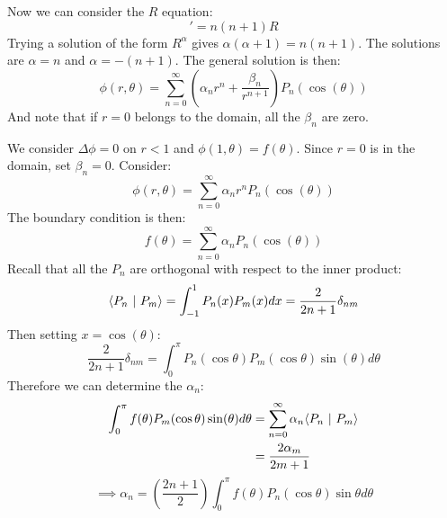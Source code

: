\documentclass[../Main.tex]{subfiles}
\begin{document}
Now we can consider the $R$ equation:
\begin{equation*}
    [r^2 R']' = n(n+1)R
\end{equation*}
Trying a solution of the form $R^\alpha$ gives $\alpha(\alpha+1) = n(n+1)$. The solutions are $\alpha = n$ and $\alpha = -(n+1)$. The general solution is then:
\begin{equation*}
    \phi(r, \theta) = \sum_{n=0}^{\infty} \left(\alpha_n r^n + \frac{\beta_n}{r^{n+1}}\right) P_n(\cos(\theta))
\end{equation*}
And note that if $r = 0$ belongs to the domain, all the $\beta_n$ are zero.
\begin{example}
    We consider $\Delta \phi = 0$ on $r < 1$ and $\phi(1, \theta) = f(\theta)$. Since $r = 0$ is in the domain, set $\beta_n = 0$. Consider:
    \begin{equation*}
        \phi(r, \theta) = \sum_{n=0}^{\infty} \alpha_nr^n P_n(\cos(\theta))
    \end{equation*}
    The boundary condition is then:
    \begin{equation*}
        f(\theta) = \sum_{n=0}^{\infty} \alpha_n P_n(\cos(\theta))
    \end{equation*}
    Recall that all the $P_n$ are orthogonal with respect to the inner product:
    \begin{equation*}
        \langle P_n~\vert~P_m\rangle = \int_{-1}^{1} P_n(x)P_m(x) dx = \frac{2}{2n+1}\delta_{nm}
    \end{equation*}
    Then setting $x = \cos(\theta)$:
    \begin{equation*}
        \frac{2}{2n+1}\delta_{nm} = \int_{0}^{\pi} P_n(\cos{\theta}) P_m (\cos{\theta})\sin(\theta) d\theta
    \end{equation*}
    Therefore we can determine the $\alpha_n$:
    \begin{align*}
        \int_{0}^{\pi} f(\theta)P_m(\cos{\theta}) \sin(\theta) d\theta &= \sum_{n=0}^{\infty} \alpha_n \langle P_n~\vert~P_m\rangle \\
        &= \frac{2\alpha_m}{2m+1} \\
    \end{align*}
    \begin{equation*}
        \implies \alpha_n = \left(\frac{2n+1}{2}\right) \int_{0}^{\pi} f(\theta) P_n(\cos{\theta}) \sin{\theta} d\theta
    \end{equation*}
\end{example}
\end{document}
